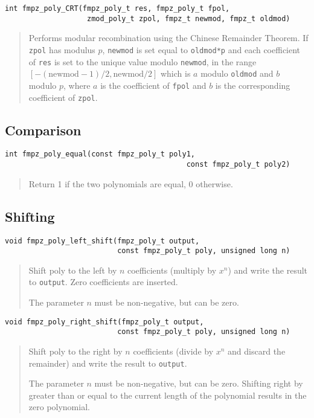 \documentclass[a4paper,10pt]{article}
\newcommand{\code}{\lstinline}
\begin{document}
\begin{lstlisting}
int fmpz_poly_CRT(fmpz_poly_t res, fmpz_poly_t fpol, 
                   zmod_poly_t zpol, fmpz_t newmod, fmpz_t oldmod)
\end{lstlisting}
\begin{quote}
Performs modular recombination using the Chinese Remainder Theorem. If \code{zpol} has modulus $p$, \code{newmod} is set equal to \code{oldmod*p} and each coefficient of \code{res} is set to the unique value modulo \code{newmod}, in the range $[-(\mbox{newmod} - 1)/2, \mbox{newmod}/2]$ which is $a$ modulo \code{oldmod} and $b$ modulo $p$, where $a$ is the coefficient of \code{fpol} and $b$ is the corresponding coefficient of \code{zpol}. 
\end{quote}

\subsection{Comparison}

\begin{lstlisting}
int fmpz_poly_equal(const fmpz_poly_t poly1, 
                                          const fmpz_poly_t poly2) 
\end{lstlisting}
\begin{quote}
Return 1 if the two polynomials are equal, 0 otherwise.
\end{quote}

\subsection{Shifting}

\begin{lstlisting}
void fmpz_poly_left_shift(fmpz_poly_t output, 
                          const fmpz_poly_t poly, unsigned long n) 
\end{lstlisting}
\begin{quote}
Shift poly to the left by $n$ coefficients (multiply by $x^n$) and write the result to \code{output}. Zero coefficients are inserted.

The parameter $n$ must be non-negative, but can be zero.
\end{quote}

\begin{lstlisting}
void fmpz_poly_right_shift(fmpz_poly_t output, 
                          const fmpz_poly_t poly, unsigned long n) 
\end{lstlisting}
\begin{quote}
Shift poly to the right by $n$ coefficients (divide by $x^n$ and discard the remainder) and write the result to \code{output}. 

The parameter $n$ must be non-negative, but can be zero. Shifting right by greater than or equal to the current length of the polynomial results in the zero polynomial.
\end{quote}
\end{document}
